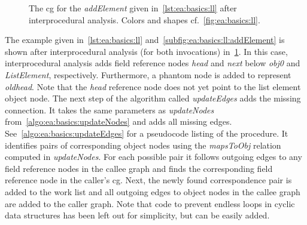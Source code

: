 			\begin{figure}
				\centering%
				\caption[The  for \emph{addElement} after interprocedural analysis]{%
					The \acrlong{cg} for the \emph{addElement} given in~\cref{lst:ea:basics:ll} after interprocedural analysis.
					Colors and shapes cf.~\cref{fig:ea:basics:ll}.}%
				\label{fig:ea:basics:ll:inter}%
			\end{figure}

			The example given in~\cref{lst:ea:basics:ll} and~\cref{subfig:ea:basics:ll:addElement} is shown after
			interprocedural analysis (for both invocations) in~\cref{fig:ea:basics:ll:inter}. In this case, interprocedural
			analysis adds field reference nodes \emph{head} and \emph{next} below \emph{obj0} and \emph{ListElement},
			respectively. Furthermore, a phantom node is added to represent \emph{oldhead}. Note that the \emph{head}
			reference node does not yet point to the list element object node. The next step of the algorithm called
			\emph{updateEdges} adds the missing connection. It takes the same parameters as \emph{updateNodes}
			from~\cref{algo:ea:basics:updateNodes} and adds all missing edges. See~\cref{algo:ea:basics:updateEdges} for
			a pseudocode listing of the procedure. It identifies pairs of corresponding object nodes using the
			\emph{mapsToObj} relation computed in \emph{updateNodes}. For each possible pair it follows outgoing edges to any
			field reference nodes in the callee graph and finds the corresponding field reference node in the caller's
			\gls{cg}. Next, the newly found correspondence pair is added to the work list and all outgoing edges to object
			nodes in the callee graph are added to the caller graph. Note that code to prevent endless loops in cyclic data
			structures has been left out for simplicity, but can be easily added.

